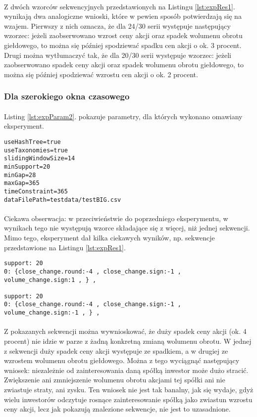 \documentclass[11pt,a4paper]{article}
\begin{document}
\paragraph{}Z dwóch wzorców sekwencyjnych przedstawionych na Listingu \ref{lst:expRes1}. wynikają dwa analogiczne wnioski, które w pewien sposób potwierdzają się na wzajem. Pierwszy z nich oznacza, że dla 24/30 serii występuje następujący wzorzec: jeżeli zaobserwowano wzrost ceny akcji oraz spadek wolumenu obrotu giełdowego, to można się później spodziewać spadku cen akcji o ok. 3 procent. Drugi można wytłumaczyć tak, że dla 20/30 serii występuje wzorzec: jeżeli zaobserwowano spadek ceny akcji oraz spadek wolumenu obrotu giełdowego, to można się później spodziewać wzrostu cen akcji o ok. 2 procent.
\newpage
\subsubsection{Dla szerokiego okna czasowego}
\paragraph{}Listing \ref{lst:expParam2}. pokazuje parametry, dla których wykonano omawiany eksperyment.
\begin{lstlisting}[caption={Parametry, eksperyment 1},label={lst:expParam2}]
useHashTree=true
useTaxonomies=true
slidingWindowSize=14
minSupport=20
minGap=28
maxGap=365
timeConstraint=365
dataFilePath=testdata/testBIG.csv
\end{lstlisting}
\paragraph{}Ciekawa obserwacja: w przeciwieństwie do poprzedniego eksperymentu, w wynikach tego nie występują wzorce składające się z więcej, niż jednej sekwencji. Mimo tego, eksperyment dał kilka ciekawych wyników, np. sekwencje przedstawione na Listingu \ref{lst:expRes1}.
\begin{lstlisting}[caption={Wzorce, eksperyment 1},label={lst:expRes1}]
support: 20 
0: {close_change.round:-4 , close_change.sign:-1 , volume_change.sign:1 , } ,

support: 20
0: {close_change.round:-4 , close_change.sign:-1 , volume_change.sign:-1 , } ,
\end{lstlisting}
\paragraph{}Z pokazanych sekwencji można wywnioskować, że duży spadek ceny akcji (ok. 4 procent) nie idzie w parze z żadną konkretną zmianą wolumenu obrotu. W jednej z sekwencji duży spadek ceny akcji występuje ze spadkiem, a w drugiej ze wzrostem wolumenu obrotu giełdowego. Można z tego wyciągnąć następujący wniosek: niezależnie od zainteresowania daną spółką inwestor może dużo stracić. Zwiększenie ani zmniejszenie wolumenu obrotu akcjami tej spółki ani nie zwiastuje straty, ani zysku. Ten wniosek nie jest tak banalny, jak się wydaje, gdyż wielu inwestorów odczytuje rosnące zainteresowanie spółką jako zwiastun wzrostu ceny akcji, lecz jak pokazują znalezione sekwencje, nie jest to uzasadnione.
\end{document}
